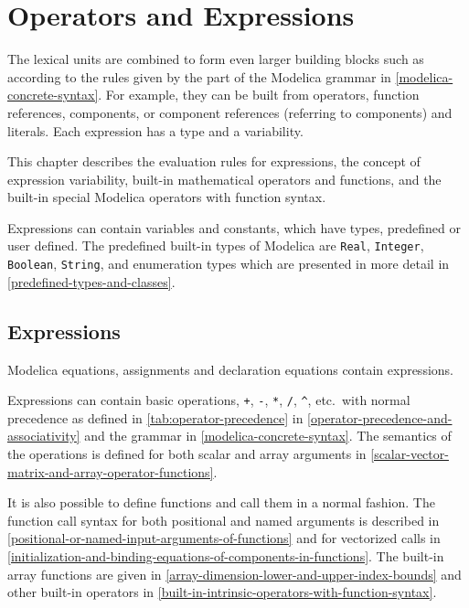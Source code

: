 \chapter{Operators and Expressions}\label{operators-and-expressions}

The lexical units are combined to form even larger building blocks such as  according to the rules given by the  part of the Modelica grammar in \cref{modelica-concrete-syntax}.
For example, they can be built from operators, function references, components, or component references (referring to components) and literals.
Each expression has a type and a variability.

This chapter describes the evaluation rules for expressions, the concept of expression variability, built-in mathematical operators and functions, and the built-in special Modelica operators with function syntax.

Expressions can contain variables and constants, which have types, predefined or user defined.
The predefined built-in types of Modelica are \lstinline!Real!, \lstinline!Integer!, \lstinline!Boolean!, \lstinline!String!, and enumeration types which are presented in more detail in \cref{predefined-types-and-classes}.


\section{Expressions}\label{expressions}

Modelica equations, assignments and declaration equations contain expressions.

Expressions can contain basic operations, \lstinline!+!, \lstinline!-!, \lstinline!*!, \lstinline!/!, \lstinline!^!, etc.\ with normal precedence as defined in \cref{tab:operator-precedence} in \cref{operator-precedence-and-associativity} and the grammar in \cref{modelica-concrete-syntax}.
The semantics of the operations is defined for both scalar and array arguments in \cref{scalar-vector-matrix-and-array-operator-functions}.

It is also possible to define functions and call them in a normal fashion.
The function call syntax for both positional and named arguments is described in \cref{positional-or-named-input-arguments-of-functions} and for vectorized calls in \cref{initialization-and-binding-equations-of-components-in-functions}.
The built-in array functions are given in \cref{array-dimension-lower-and-upper-index-bounds} and other built-in operators in \cref{built-in-intrinsic-operators-with-function-syntax}.



